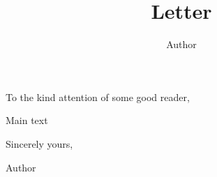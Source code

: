 \documentclass[a4paper]{article}
\title{Letter}
\author{Author}
\date{}
\makeatletter
\renewcommand{\maketitle}{\bgroup\setlength{\parindent}{0pt}
    \begin{flushleft}
    \textbf{{\Large\@title}}

    \@author
    \end{flushleft}\egroup
    }
\makeatother
\begin{document}
\maketitle
\thispagestyle{empty} %

\vspace{1cm}

To the kind attention of some good reader,

\vspace{0.5cm}

Main text

Sincerely yours,

\vspace{0.3cm}

\null\hfill Author
\end{document}
